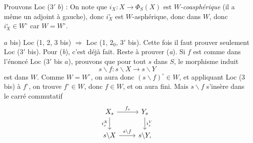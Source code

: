 \documentclass[11pt]{article}
\newcommand{\msp}[1]{\marginpar{\footnotesize [#1]}}
\begin{document}
Prouvons Loc ($3'$ $b$) : On note que $i_X : X \longrightarrow \Phi_S(X)$ est $W$\textit{-coasphérique} (il a même un adjoint à gauche), donc $i_X^\circ$ est $W$-asphérique, donc dans $W$, donc $i_X^\circ \in W^\circ$ car $W = W^\circ$. %

$a$ bis) Loc (1, 2, 3 bis) $\Longrightarrow$ Loc (1, $2_0$, $3'$ bis). Cette fois il faut prouver seulement Loc ($3'$ bis). Pour (\textit{b}), c’est déjà fait. Reste à prouver (\textit{a}). Si $f$ est comme dans l’énoncé Loc ($3'$ bis $a$), prouvons que pour tout $s$ dans $S$, le morphisme induit
\[
s\backslash f : s\backslash X \longrightarrow s\backslash Y
\]
est dans $W$. Comme $W = W^\circ$, on aura donc $(s\backslash f)^\circ \in W$, et appliquant Loc (3 bis) à $f^\circ$, on trouve $f^\circ \in W$, donc $f \in W$, et on aura fini. Mais $s\backslash f$ s’insère dans le carré commutatif
\msp{page 6}
\[
\begin{tikzcd}
X_s \arrow[r, "f_s"] \arrow[d, "i_s^X"'] & Y_s \arrow[d, "i_s^Y"] \\
s\backslash X \arrow[r, "s\backslash f"] & s\backslash Y,
\end{tikzcd}
\]
\end{document}

